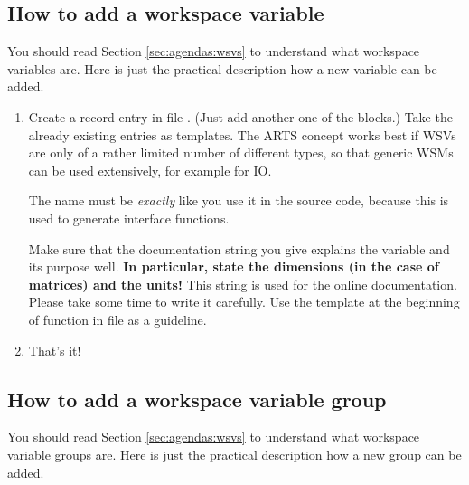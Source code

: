 \subsection{How to add a workspace variable}

You should read Section \ref{sec:agendas:wsvs} to understand what workspace
variables are. Here is just the practical description how a new
variable can be added.

\begin{enumerate}
\item Create a record entry in file . (Just add
  another one of the  blocks.) Take the
  already existing entries as templates. The ARTS concept works best
  if WSVs are only of a rather limited number of different types, so
  that generic WSMs can be used extensively, for example for IO.
  
  The name must be \emph{exactly} like you use it in the source code,
  because this is used to generate interface functions.
  
  Make sure that the documentation string you give explains the
  variable and its purpose well. \textbf{In particular, state the
    dimensions (in the case of matrices) and the units!} This string
  is used for the online documentation. Please take some time to write
  it carefully. Use the template at the beginning of function
   in file  as a
  guideline. 

\item That's it!
\end{enumerate}


\subsection{How to add a workspace variable group}

You should read Section \ref{sec:agendas:wsvs} to understand what workspace
variable groups are. Here is just the practical description how a new
group can be added.

